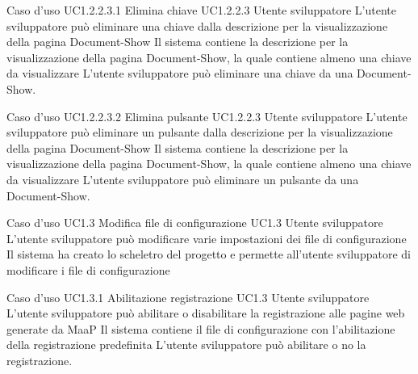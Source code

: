 \UCtitle
{Caso d'uso UC1.2.2.3.1}
{Elimina chiave}
\UC
{UC1.2.2.3}
{Utente sviluppatore}
{L'utente sviluppatore  può eliminare una chiave  dalla descrizione per la visualizzazione della pagina Document-Show}
{Il sistema contiene la descrizione per la visualizzazione della pagina Document-Show, la quale contiene almeno una chiave da visualizzare}
\scenario
{L'utente sviluppatore può eliminare una chiave da una Document-Show.}

\UCtitle
{Caso d'uso UC1.2.2.3.2}
{Elimina pulsante}
\UC
{UC1.2.2.3}
{Utente sviluppatore}
{L'utente sviluppatore può eliminare un pulsante dalla descrizione per la visualizzazione della pagina Document-Show}
{Il sistema contiene la descrizione per la visualizzazione della pagina Document-Show, la quale contiene almeno una chiave da visualizzare}
\scenario
{L'utente sviluppatore può eliminare un pulsante da una Document-Show.}


\UCtitle
{Caso d'uso UC1.3}
{Modifica file di configurazione}
\UC
{UC1.3}
{Utente sviluppatore}
{L'utente sviluppatore  può modificare varie impostazioni dei file di configurazione}
{Il sistema ha creato lo scheletro del progetto e permette all'utente sviluppatore di modificare i file di configurazione}

\UCtitle
{Caso d'uso UC1.3.1}
{Abilitazione registrazione}
\UC
{UC1.3}
{Utente sviluppatore}
{L'utente sviluppatore può abilitare o disabilitare la registrazione alle pagine web generate da MaaP}
{Il sistema contiene il file di configurazione con l'abilitazione della registrazione predefinita}
\scenario
{L'utente sviluppatore può abilitare o no la registrazione.}


